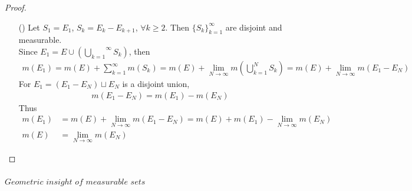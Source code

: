 \begin{thm}
\begin{proof}
\begin{enumerate}
				\item[(\rmnum{2})]Let $S_1 = E_1$, $S_k = E_k - E_{k + 1}$, $\forall k \geq 2$. Then $\{ S_k \}_{k = 1}^{\infty}$ are disjoint and measurable.\\
				Since $E_1 = E \cup \left( \overset{\infty}{\underset{k = 1}{\bigcup}}{S_k} \right)$, then
				\begin{align}
					m(E_1) = m(E) + \sum_{k = 1}^{\infty}{m(S_k)} = m(E) + \lim_{N \to \infty}{m(\bigcup_{k = 1}^{N}{S_k})} = m(E) + \lim_{N \to \infty}{m(E_1 - E_N)}
				\end{align}
				For $E_1 = (E_1 - E_N) \sqcup E_N$ is a disjoint union,
				\begin{align}
					m(E_1 - E_N) = m(E_1) - m(E_N)
				\end{align}
				Thus
				\begin{align}
					m(E_1) &= m(E) + \lim_{N \to \infty}{m(E_1 - E_N)} = m(E) + m(E_1) - \lim_{N \to \infty}{m(E_N)} \\
					m(E) &= \lim_{N \to \infty}{m(E_N)}
				\end{align}
			\end{enumerate}
		\end{proof}
	\end{thm}

	\vspace{2em}
\paragraph{$Geometric \,\, insight \,\, of \,\, measurable \,\, sets$}

